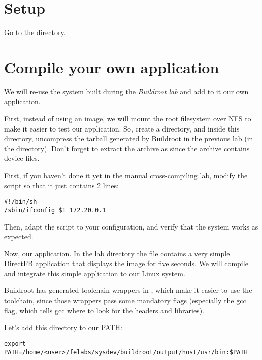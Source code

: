 
\section{Setup}

Go to the  directory.

\section{Compile your own application}

We will re-use the system built during the {\em Buildroot lab} and add
to it our own application.

First, instead of using an  image, we will mount the root
filesystem over NFS to make it easier to test our application. So,
create a  directory, and inside this directory,
uncompress the tarball generated by Buildroot in the previous lab (in
the  directory). Don't forget to extract the
archive as  since the archive contains device files.

First, if you haven't done it yet in the manual cross-compiling lab,
modify the  script so that it just contains 2 lines:
\begin{verbatim}
#!/bin/sh
/sbin/ifconfig $1 172.20.0.1
\end{verbatim}

Then, adapt the  script to your configuration, and
verify that the system works as expected.

Now, our application. In the lab directory the file 
contains a very simple DirectFB application that displays the
 image for five seconds. We will compile and
integrate this simple application to our Linux system.

Buildroot has generated toolchain wrappers in
, which make it easier to use the toolchain,
since those wrappers pass some mandatory flags (especially the
 gcc flag, which tells gcc where to look for the
headers and libraries).

Let's add this directory to our PATH:
\begin{verbatim}
export PATH=/home/<user>/felabs/sysdev/buildroot/output/host/usr/bin:$PATH
\end{verbatim}

